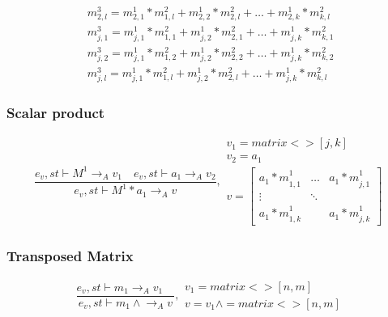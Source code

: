 \begin{minipage}{1.0\textwidth}
\begin{equation*}
\begin{aligned}
{ { m }_{ 2,l }^{ 3 } }  = { { m }_{ 2,1 }^{ 1 } } *{ { m }_{ 1,l }^{ 2 } }+ { { m }_{ 2,2 }^{ 1 } } *{ { m }_{ 2,l }^{ 2 } }+\dots+ { { m }_{ 2,k }^{ 1 } } *{ { m }_{ k,l }^{ 2 } }\\
{ { m }_{ j,1 }^{ 3 } }  = { { m }_{ j,1 }^{ 1 } } *{ { m }_{ 1,1 }^{ 2 } }+ { { m }_{ j,2 }^{ 1 } } *{ { m }_{ 2,1 }^{ 2 } }+\dots+ { { m }_{ j,k }^{ 1 } } *{ { m }_{ k,1 }^{ 2 } }\\
{ { m }_{ j,2 }^{ 3 } }  = { { m }_{ j,1 }^{ 1 } } *{ { m }_{ 1,2 }^{ 2 } }+ { { m }_{ j,2 }^{ 1 } } *{ { m }_{ 2,2 }^{ 2 } }+\dots+ { { m }_{ j,k }^{ 1 } } *{ { m }_{ k,2 }^{ 2 } }\\
{ { m }_{ j,l }^{ 3 } }  = { { m }_{ j,1 }^{ 1 } } *{ { m }_{ 1,l }^{ 2 } }+ { { m }_{ j,2 }^{ 1 } } *{ { m }_{ 2,l }^{ 2 } }+\dots+ { { m }_{ j,k }^{ 1 } } *{ { m }_{ k,l }^{ 2 } }
\end{aligned}
\end{equation*}
\end{minipage}

\subsubsection{Scalar product}
\begin{equation}
	\frac { { e }_{ v },st\vdash { M }^{ 1 }{ \rightarrow  }_{ A }{ v }_{ 1 }\quad { e }_{ v },st\vdash { a }_{ 1 }{ \rightarrow  }_{ A }{ v }_{ 2 } }{ { e }_{ v },st\vdash { M }^{ 1 }\ast { a }_{ 1 }{ \rightarrow  }_{ A }{ v } } ,\begin{matrix} { v }_{ 1 }=matrix<>[j,k] \\ { v }_{ 2 }={ a }_{ 1 } \\ v=\begin{bmatrix} { { a }_{ 1 }*m }_{ 1,1 }^{ 1 } & \dots  & { { a }_{ 1 }*m }_{ j,1 }^{ 1 } \\ \vdots  & \ddots  &  \\ { { a }_{ 1 }*m }_{ 1,k }^{ 1 } &  & { { a }_{ 1 }*m }_{ j,k }^{ 1 } \end{bmatrix} \end{matrix}
\end{equation}

\subsubsection{Transposed Matrix}
\begin{equation}
	\frac { { e }_{ v },st\vdash { m }_{ 1 }{ \rightarrow  }_{ A }{ v }_{ 1 }\quad  }{ { e }_{ v },st\vdash { m }_{ 1 }\wedge { \rightarrow  }_{ A }{ v } } ,\begin{matrix} { v }_{ 1 }=matrix<>[n,m] \\ { v }={ v }_{ 1 }\wedge =matrix<>[n,m] \end{matrix}
\end{equation}

